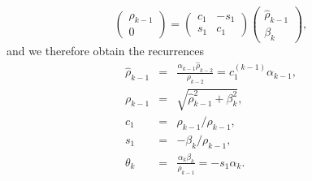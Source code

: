 \documentclass[11pt]{article}
\begin{document}
\[ \begin{pmatrix} \rho_{k-1} \\ 0 \end{pmatrix}
= \begin{pmatrix}  c_1 & -s_1 \\ s_1 & c_1 \end{pmatrix}
\begin{pmatrix} \hat{\rho}_{k-1} \\ \beta_k \end{pmatrix},
\]
and we therefore obtain the recurrences
\begin{eqnarray}
\hat{\rho}_{k-1} &=& \frac{\alpha_{k-1}\hat{\rho}_{k-2}}{\rho_{k-2}} = c_1^{(k-1)}\alpha_{k-1}, \\
\rho_{k-1} &=& \sqrt{\hat{\rho}^2_{k-1} + \beta^2_k }, \\
c_1 &=& \hat{\rho}_{k-1}/\rho_{k-1}, \\
s_1 &=& -\beta_k/\rho_{k-1}, \\
\theta_{k} &=& \frac{\alpha_k\beta_k}{\rho_{k-1}} = -s_1 \alpha_k.
\end{eqnarray}
\end{document}
